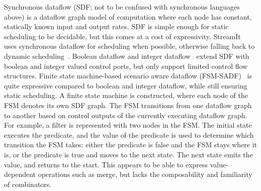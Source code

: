 Synchronous dataflow (SDF; not to be confused with synchronous languages above) is a dataflow graph model of computation where each node has constant, statically known input and output rates.
SDF is simple enough for static scheduling to be decidable, but this comes at a cost of expressivity.
StreamIt~\cite{thies2002streamit} uses synchronous dataflow for scheduling when possible, otherwise falling back to dynamic scheduling~\cite{soule2013dynamic}.
Boolean dataflow and integer dataflow~\cite{buck1993scheduling,buck1994static} extend SDF with boolean and integer valued control ports, but only support limited control flow structures.
Finite state machine-based scenario aware dataflow (FSM-SADF)~\cite{stuijk2011scenario,van2015scenario} is quite expressive compared to boolean and integer dataflow, while still ensuring static scheduling.
A finite state machine is constructed, where each node of the FSM denotes its own SDF graph.
The FSM transitions from one dataflow graph to another based on control outputs of the currently executing dataflow graph.
For example, a filter is represented with two nodes in the FSM.
The initial state executes the predicate, and the value of the predicate is used to determine which transition the FSM takes: either the predicate is false and the FSM stays where it is, or the predicate is true and moves to the next state.
The next state emits the value, and returns to the start.
This appears to be able to express value-dependent operations such as merge, but lacks the composability and familiarity of combinators.

% 


